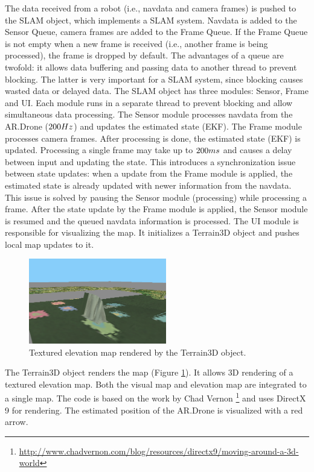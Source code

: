 The data received from a robot (i.e., navdata and camera frames) is pushed to the SLAM object, which implements a SLAM system.
Navdata is added to the Sensor Queue, camera frames are added to the Frame Queue.
If the Frame Queue is not empty when a new frame is received (i.e., another frame is being processed), the frame is dropped by default.
The advantages of a queue are twofold: it allows data buffering and passing data to another thread to prevent blocking.
The latter is very important for a SLAM system, since blocking causes wasted data or delayed data.
The SLAM object has three modules: Sensor, Frame and UI.
Each module runs in a separate thread to prevent blocking and allow simultaneous data processing.
The Sensor module processes navdata from the AR.Drone ($200 \small{Hz}$) and updates the estimated state (EKF).
The Frame module processes camera frames.
After processing is done, the estimated state (EKF) is updated.
Processing a single frame may take up to $200 \small{ms}$ and causes a delay between input and updating the state.
This introduces a synchronization issue between state updates: when a update from the Frame module is applied, the estimated state is already updated with newer information from the navdata.
This issue is solved by pausing the Sensor module (processing) while processing a frame.
After the state update by the Frame module is applied, the Sensor module is resumed and the queued navdata information is processed.
The UI module is responsible for visualizing the map.
It initializes a Terrain3D object and pushes local map updates to it.

\begin{figure}[htb!]
\centering
\includegraphics[width=6cm]{images/3dterrain_map.png}
\caption{Textured elevation map rendered by the Terrain3D object.} 
\label{fig:terrain3d_map}
\end{figure}

The Terrain3D object renders the map (Figure \ref{fig:terrain3d_map}).
It allows 3D rendering of a textured elevation map.
Both the visual map and elevation map are integrated to a single map.
The code is based on the work by Chad Vernon \footnote{\url{http://www.chadvernon.com/blog/resources/directx9/moving-around-a-3d-world}} and uses DirectX 9 for rendering.
The estimated position of the AR.Drone is visualized with a red arrow.